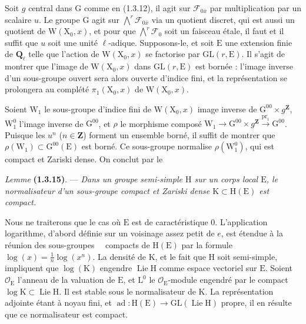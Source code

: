 \documentclass[11pt,leqno]{article}
\newcommand{\Page}[1]{\ifvmode\noindent\else\unskip\ \fi{\footnotesize\textcolor{gray}{[p.\,#1]}}\ \ignorespaces}
\begin{document}
Soit \(g\) central dans \(\mathrm{G}\) comme en (1.3.12), il agit sur \(\mathcal{F}_{0\bar{x}}\) par multiplication par un scalaire \(u\). Le groupe \(\mathrm{G}\) agit sur \(\bigwedge\limits^r\mathcal{F}_{0\bar{x}}\) via un quotient discret, qui est aussi un quotient de \(\mathrm{W}(\mathrm{X}_0,x)\), et pour que \(\bigwedge\limits^r\mathcal{F}_0\) soit un faisceau étale, il faut et il suffit que \(u\) soit une unité \(\ell\)-adique. Supposons-le, et soit \(\mathrm{E}\) une extension finie de \(\mathbf{Q}_\ell\) telle que l’action de \(\mathrm{W}(\mathrm{X}_0,x)\) se factorise par \(\mathrm{GL}(r,\mathrm{E})\). Il s’agit de montrer que l’image de \(\mathrm{W}(\mathrm{X}_0,x)\) dans \(\mathrm{GL}(r,\mathrm{E})\) est bornée : l’image inverse d’un sous-groupe ouvert sera alors ouverte d’indice fini, et la représentation se prolongera au complété \(\pi_1(\mathrm{X}_0,x)\) de \(\mathrm{W}(\mathrm{X}_0,x)\).

Soient \(\mathrm{W}_1\) le sous-groupe d’indice fini de \(\mathrm{W}(\mathrm{X}_0,x)\) image inverse de \(\mathrm{G}^{00}\times g^{\mathbf{Z}}\), \(\mathrm{W}_1^0\) l’image inverse de \(\mathrm{G}^{00}\), et \(\rho\) le morphisme composé \(\mathrm{W}_1\to\mathrm{G}^{00}\times g^{\mathbf{Z}}\xrightarrow{\mathrm{pr}_1}\mathrm{G}^{00}\). Puisque les \(u^n\) (\(n\in\mathbf{Z}\)) forment un ensemble borné, il suffit de montrer que \(\rho(\mathrm{W}_1)\subset\mathrm{G}^{00}(\mathrm{E})\) est borné. Ce sous-groupe normalise \(\rho(\mathrm{W}_1^0)\), qui est compact et Zariski dense. On conclut par le

\textit{Lemme} \textbf{(1.3.15)}. — \textit{Dans un groupe semi-simple \(\mathrm{H}\) sur un corps local \(\mathrm{E}\), le normalisateur d’un sous-groupe compact et Zariski dense \(\mathrm{K}\subset\mathrm{H}(\mathrm{E})\) est compact.}

Nous ne traiterons que le cas où \(\mathrm{E}\) est de caractéristique \(0\). L’application logarithme, d’abord définie sur un voisinage assez petit de \(e\), est étendue à la réunion des sous-groupes \Page{162}compacts de \(\mathrm{H}(\mathrm{E})\) par la formule \(\log(x)=\frac{1}{n}\log(x^n)\). La densité de \(\mathrm{K}\), et le fait que \(\mathrm{H}\) soit semi-simple, impliquent que \(\log(\mathrm{K})\) engendre \(\operatorname{Lie}\mathrm{H}\) comme espace vectoriel sur \(\mathrm{E}\). Soient \(\mathcal{O}_{\mathrm{E}}\) l’anneau de la valuation de \(\mathrm{E}\), et \(\mathrm{L}^0\) le \(\mathcal{O}_{\mathrm{E}}\)-module engendré par le compact \(\log\mathrm{K}\subset\operatorname{Lie}\mathrm{H}\). Il est stable sous le normalisateur de \(\mathrm{K}\). La représentation adjointe étant à noyau fini, et \(\operatorname{ad}:\mathrm{H}(\mathrm{E})\to\mathrm{GL}(\operatorname{Lie}\mathrm{H})\) propre, il en résulte que ce normalisateur est compact.
\end{document}
